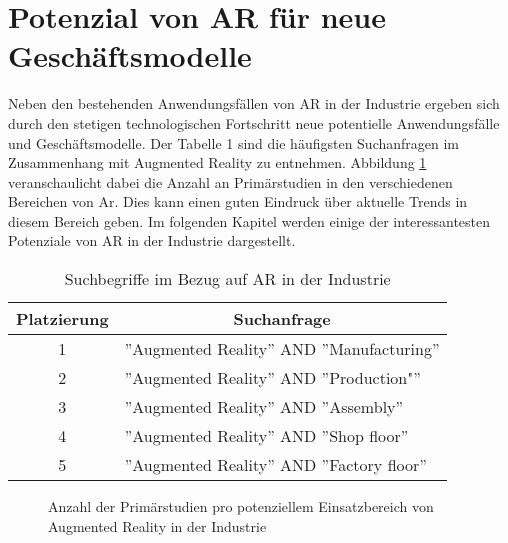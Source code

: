 \section{Potenzial von AR für neue Geschäftsmodelle}

Neben den bestehenden Anwendungsfällen von AR in der Industrie ergeben sich
durch den stetigen technologischen Fortschritt neue potentielle Anwendungsfälle
und Geschäftsmodelle. Der Tabelle 1 sind die häufigsten Suchanfragen im
Zusammenhang mit Augmented Reality zu entnehmen. Abbildung
\ref{fig:studienverteilung} veranschaulicht dabei die Anzahl an Primärstudien
in den verschiedenen Bereichen von Ar. Dies kann einen guten Eindruck über
aktuelle Trends in diesem Bereich geben. Im folgenden Kapitel werden einige der
interessantesten Potenziale von AR in der Industrie dargestellt.\\

\begin{table}[h]
    \centering
    \captionsetup{font=small}
    \label{tabelle1}
    \renewcommand{\arraystretch}{1.35} %

    \begin{tabular}{c|l}
        \multicolumn{1}{c|}{Platzierung} & \multicolumn{1}{c}{\centering Suchanfrage}  \\
        \hline
        1                                & ''Augmented Reality'' AND ''Manufacturing'' \\
        2                                & ''Augmented Reality'' AND ''Production"''   \\
        3                                & ''Augmented Reality'' AND ''Assembly''      \\
        4                                & ''Augmented Reality'' AND ''Shop floor''    \\
        5                                & ''Augmented Reality'' AND ''Factory floor'' \\
        \hline

    \end{tabular}
    \caption{Suchbegriffe im Bezug auf AR in der Industrie \cite{de2018augmented}}

\end{table}

\begin{figure}[h]
    \centering
    
    \caption[width=0.7schaff\columnwidth]{Anzahl der Primärstudien pro potenziellem Einsatzbereich von Augmented Reality in der Industrie \cite{de2020survey}}
    \label{fig:studienverteilung}
\end{figure}

